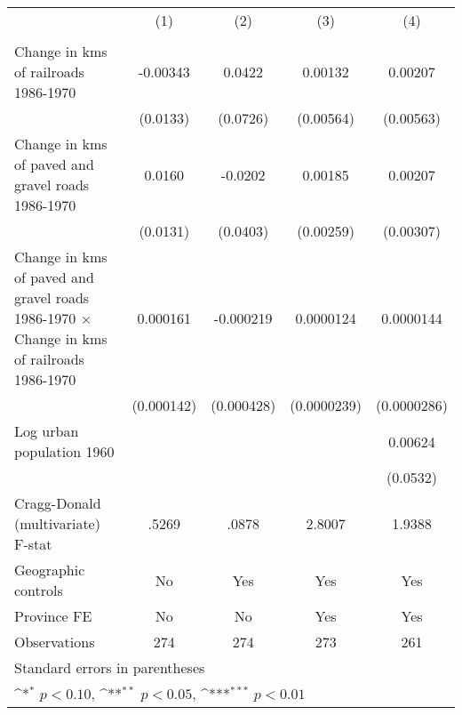 {
\def\sym#1{\ifmmode^{#1}\else\(^{#1}\)\fi}
\begin{tabular}{l*{4}{c}}
\hline\hline
                &\multicolumn{1}{c}{(1)}&\multicolumn{1}{c}{(2)}&\multicolumn{1}{c}{(3)}&\multicolumn{1}{c}{(4)}\\
                &\multicolumn{1}{c}{}&\multicolumn{1}{c}{}&\multicolumn{1}{c}{}&\multicolumn{1}{c}{}\\
\hline
Change in kms of railroads 1986-1970& -0.00343         &   0.0422         &  0.00132         &  0.00207         \\
                & (0.0133)         & (0.0726)         &(0.00564)         &(0.00563)         \\
[1em]
Change in kms of paved and gravel roads 1986-1970&   0.0160         &  -0.0202         &  0.00185         &  0.00207         \\
                & (0.0131)         & (0.0403)         &(0.00259)         &(0.00307)         \\
[1em]
Change in kms of paved and gravel roads 1986-1970 $\times$ Change in kms of railroads 1986-1970& 0.000161         &-0.000219         &0.0000124         &0.0000144         \\
                &(0.000142)         &(0.000428)         &(0.0000239)         &(0.0000286)         \\
[1em]
Log urban population 1960&                  &                  &                  &  0.00624         \\
                &                  &                  &                  & (0.0532)         \\
\hline
Cragg-Donald (multivariate) F-stat&    .5269         &    .0878         &   2.8007         &   1.9388         \\
Geographic controls&       No         &      Yes         &      Yes         &      Yes         \\
Province FE     &       No         &       No         &      Yes         &      Yes         \\
Observations    &      274         &      274         &      273         &      261         \\
\hline\hline
\multicolumn{5}{l}{\footnotesize Standard errors in parentheses}\\
\multicolumn{5}{l}{\footnotesize \sym{*} \(p<0.10\), \sym{**} \(p<0.05\), \sym{***} \(p<0.01\)}\\
\end{tabular}
}
